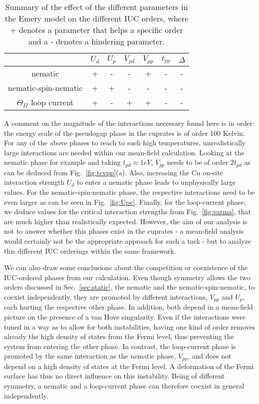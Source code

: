 \documentclass[prb, twocolumn,showpacs,preprintnumbers,amsmath,amssymb, floatfix]{revtex4}
\begin{document}
\begin{table}[b!]
  \centering
  \begin{tabular}{c|c|c|c|c|c|c}
    & $U_d$ & $U_p$ & $V_{pd}$ & $V_{pp}$ & $t_{pp}$ & $\Delta$\\
    \hline
    \hline
    nematic & + & - & - & + & - & -\\
    \hline
    nematic-spin-nematic & + & + & - & - & - & -\\
    \hline
    $\Theta_{II}$ loop current & + & -& + & + & - & -
  \end{tabular}
  \caption{Summary of the effect of the different parameters in the Emery model on the different IUC orders, where + denotes a parameter that helps a specific order and a - denotes a hindering parameter.}
  \label{tab:params}
\end{table}

A comment on the magnitude of the interactions necessary found here is in order: the energy scale of the pseudogap phase in the cuprates is of order 100 Kelvin. For any of the above phases to reach to such high temperatures, unrealistically large interactions are needed within our mean-field calculation. Looking at the nematic phase for example and taking $t_{pd}\approx1eV$, $V_{pp}$ needs to be of order $2t_{pd}$ as can be deduced from Fig.~\ref{fig:tcvpp}(a). Also, increasing the Cu on-site interaction strength $U_{d}$ to enter a nematic phase leads to unphysically large values.
For the nematic-spin-nematic phase, the respective interactions need to be even larger as can be seen in Fig.~\ref{fig:Upc}.
Finally, for the loop-current phase, we deduce values for the critical interaction strengths from Fig.~\ref{fig:varma}, that are much higher than realistically expected.
However, the aim of our analysis is not to answer whether this phases exist in the cuprates - a mean-field analysis would certainly not be the appropriate approach for such a task - but to analyze this different IUC orderings within the same framework.

We can also draw some conclusions about the competition or coexistence of the IUC-ordered phases from our calculation. Even though symmetry allows the two orders discussed in Sec.~\ref{sec:static}, the nematic and the nematic-spin-nematic, to coexist independently, they are promoted by different interactions, $V_{pp}$ and $U_p$, each hurting the respective other phase. In addition, both depend in a mean-field picture on the presence of a van Hove singularity. Even if the interactions were tuned in a way as to allow for both instabilities, having one kind of order removes already the high density of states from the Fermi level, thus preventing the system from entering the other phase. In contrast, the loop-current phase is promoted by the same interaction as the nematic phase, $V_{pp}$, and does not depend on a high density of states at the Fermi level. A deformation of the Fermi surface has thus no direct influence on this instability. Being of different symmetry, a nematic and a loop-current phase can therefore coexist in general independently.
\end{document}
